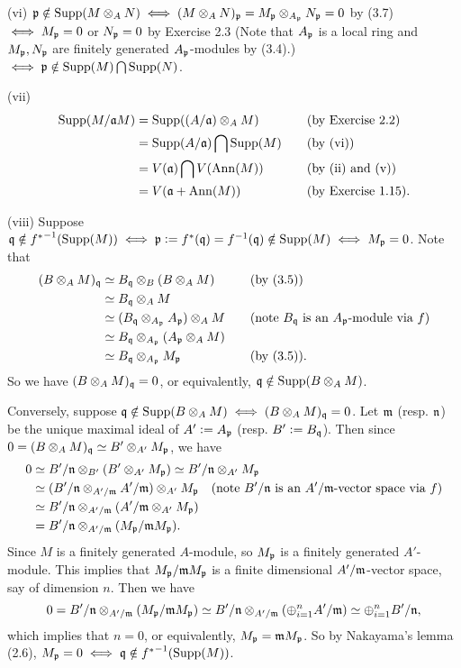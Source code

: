 \documentclass[../A&M.tex]{subfiles}
\begin{document}
(vi) $\mathfrak{p} \notin \operatorname{Supp}(M\otimes_A N) \iff (M\otimes_A N)_{\mathfrak{p}} = M_{\mathfrak{p}} \otimes_{A_{\mathfrak{p}}} N_{\mathfrak{p}} = 0$ by (3.7) $\iff M_{\mathfrak{p}} = 0$ or $N_{\mathfrak{p}} = 0$ by Exercise 2.3 (Note that $A_{\mathfrak{p}}$ is a local ring and $M_{\mathfrak{p}},N_{\mathfrak{p}}$ are finitely generated $A_{\mathfrak{p}}$-modules by (3.4).) $\iff \mathfrak{p} \notin \operatorname{Supp}(M) \bigcap \operatorname{Supp}(N)$.

(vii)
\begin{alignat*}{2}
\operatorname{Supp}(M/\mathfrak{a} M)
&= \operatorname{Supp}((A/\mathfrak{a}) \otimes_A M) \quad &&\text{(by Exercise 2.2)} \\ 
&= \operatorname{Supp}(A/\mathfrak{a}) \bigcap \operatorname{Supp}(M)  \quad &&\text{(by (vi))}  \\
&= V(\mathfrak{a}) \bigcap V(\operatorname{Ann}(M))  \quad &&\text{(by (ii) and (v))} \\
&= V(\mathfrak{a} + \operatorname{Ann}(M))  \quad &&\text{(by Exercise 1.15)}.
\end{alignat*}

(viii) Suppose $\mathfrak{q} \notin {f^*}^{-1}(\operatorname{Supp}(M)) \iff \mathfrak{p}:=f^*(\mathfrak{q})=f^{-1}(\mathfrak{q}) \notin \operatorname{Supp}(M) \iff M_{\mathfrak{p}}=0$. Note that
\begin{alignat*}{2}
(B \otimes_A M)_{\mathfrak{q}}
&\simeq B_{\mathfrak{q}} \otimes_B (B \otimes_A M)    &&\quad \text{(by (3.5))}  \\
&\simeq B_{\mathfrak{q}} \otimes_A M    \\
&\simeq (B_{\mathfrak{q}} \otimes_{A_{\mathfrak{p}}} A_{\mathfrak{p}}) \otimes_A M  &&\quad \text{(note $B_{\mathfrak{q}}$ is an $A_{\mathfrak{p}}$-module via $f$)}  \\
&\simeq B_{\mathfrak{q}} \otimes_{A_{\mathfrak{p}}} (A_{\mathfrak{p}} \otimes_A M)   \\
&\simeq B_{\mathfrak{q}} \otimes_{A_{\mathfrak{p}}} M_{\mathfrak{p}}  &&\quad \text{(by (3.5))}.
\end{alignat*}
So we have $(B \otimes_A M)_{\mathfrak{q}}=0$, or equivalently, $\mathfrak{q} \notin \operatorname{Supp}(B \otimes_A M)$.

Conversely, suppose $\mathfrak{q} \notin \operatorname{Supp}(B \otimes_A M) \iff (B \otimes_A M)_{\mathfrak{q}}=0$. Let $\mathfrak{m}$ (resp. $\mathfrak{n}$) be the unique maximal ideal of $A':=A_{\mathfrak{p}}$ (resp. $B':=B_{\mathfrak{q}}$). Then since $0 = (B \otimes_A M)_{\mathfrak{q}} \simeq B' \otimes_{A'} M_{\mathfrak{p}}$, we have
\begin{align*}
0
&\simeq B'/\mathfrak{n} \otimes_{B'} (B' \otimes_{A'} M_{\mathfrak{p}})  
\simeq B'/\mathfrak{n} \otimes_{A'} M_{\mathfrak{p}}   \\
&\simeq (B'/\mathfrak{n} \otimes_{A'/\mathfrak{m}} A'/\mathfrak{m}) \otimes_{A'} M_{\mathfrak{p}}  \quad \text{(note $B'/\mathfrak{n}$ is an $A'/\mathfrak{m}$-vector space via $f$)}  \\
&\simeq B'/\mathfrak{n} \otimes_{A'/\mathfrak{m}} (A'/\mathfrak{m} \otimes_{A'} M_{\mathfrak{p}})     \\
&
= B'/\mathfrak{n} \otimes_{A'/\mathfrak{m}} (M_{\mathfrak{p}}/\mathfrak{m} M_{\mathfrak{p}}).
\end{align*}
Since $M$ is a finitely generated $A$-module, so $M_{\mathfrak{p}}$ is a finitely generated $A'$-module. This implies that $M_{\mathfrak{p}}/\mathfrak{m} M_{\mathfrak{p}}$ is a finite dimensional $A'/\mathfrak{m}$-vector space, say of dimension $n$. Then we have
$$
0 = B'/\mathfrak{n} \otimes_{A'/\mathfrak{m}} (M_{\mathfrak{p}}/\mathfrak{m} M_{\mathfrak{p}})
\simeq B'/\mathfrak{n} \otimes_{A'/\mathfrak{m}} ( \oplus_{i=1}^n A'/\mathfrak{m})
\simeq \oplus_{i=1}^n B'/\mathfrak{n},
$$
which implies that $n=0$, or equivalently, $M_{\mathfrak{p}} = \mathfrak{m} M_{\mathfrak{p}}$. So by Nakayama's lemma (2.6), $M_{\mathfrak{p}} = 0 \iff \mathfrak{q} \notin {f^*}^{-1}(\operatorname{Supp}(M))$.
\end{document}
